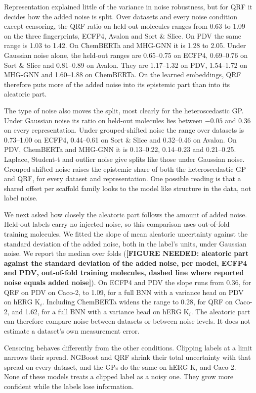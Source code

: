 Representation explained little of the variance in noise robustness, but for QRF it decides how the added noise is split. Over datasets and every noise condition except censoring, the QRF ratio on held-out molecules ranges from 0.63 to 1.09 on the three fingerprints, ECFP4, Avalon and Sort \& Slice. On PDV the same range is 1.03 to 1.42. On ChemBERTa and MHG-GNN it is 1.28 to 2.05. Under Gaussian noise alone, the held-out ranges are 0.65--0.75 on ECFP4, 0.69--0.76 on Sort \& Slice and 0.81--0.89 on Avalon. They are 1.17--1.32 on PDV, 1.54--1.72 on MHG-GNN and 1.60--1.88 on ChemBERTa. On the learned embeddings, QRF therefore puts more of the added noise into its epistemic part than into its aleatoric part.

The type of noise also moves the split, most clearly for the heteroscedastic GP. Under Gaussian noise its ratio on held-out molecules lies between $-0.05$ and 0.36 on every representation. Under grouped-shifted noise the range over datasets is 0.73--1.00 on ECFP4, 0.44--0.61 on Sort \& Slice and 0.32--0.46 on Avalon. On PDV, ChemBERTa and MHG-GNN it is 0.13--0.22, 0.14--0.23 and 0.21--0.25. Laplace, Student-t and outlier noise give splits like those under Gaussian noise. Grouped-shifted noise raises the epistemic share of both the heteroscedastic GP and QRF, for every dataset and representation. One possible reading is that a shared offset per scaffold family looks to the model like structure in the data, not label noise.

We next asked how closely the aleatoric part follows the amount of added noise. Held-out labels carry no injected noise, so this comparison uses out-of-fold training molecules. We fitted the slope of mean aleatoric uncertainty against the standard deviation of the added noise, both in the label's units, under Gaussian noise. We report the median over folds (\textbf{[FIGURE NEEDED: aleatoric part against the standard deviation of the added noise, per model, ECFP4 and PDV, out-of-fold training molecules, dashed line where reported noise equals added noise]}). On ECFP4 and PDV the slope runs from 0.36, for QRF on PDV on Caco-2, to 1.09, for a full BNN with a variance head on PDV on hERG K$_i$. Including ChemBERTa widens the range to 0.28, for QRF on Caco-2, and 1.62, for a full BNN with a variance head on hERG K$_i$. The aleatoric part can therefore compare noise between datasets or between noise levels. It does not estimate a dataset's own measurement error.

Censoring behaves differently from the other conditions. Clipping labels at a limit narrows their spread. NGBoost and QRF shrink their total uncertainty with that spread on every dataset, and the GPs do the same on hERG K$_i$ and Caco-2. None of these models treats a clipped label as a noisy one. They grow more confident while the labels lose information.
